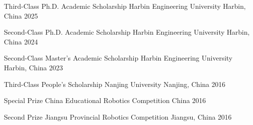 

\begin{cvhonors}

  \cvhonor
    {Third-Class Ph.D. Academic Scholarship}
    {Harbin Engineering University}
    {Harbin, China}
    {2025}

  \cvhonor
    {Second-Class Ph.D. Academic Scholarship}
    {Harbin Engineering University}
    {Harbin, China}
    {2024}

  \cvhonor
    {Second-Class Master's Academic Scholarship}
    {Harbin Engineering University}
    {Harbin, China}
    {2023}

  \cvhonor
    {Third-Class People's Scholarship}
    {Nanjing University}
    {Nanjing, China}
    {2016}

  \cvhonor
    {Special Prize}
    {China Educational Robotics Competition}
    {China}
    {2016}

  \cvhonor
    {Second Prize}
    {Jiangsu Provincial Robotics Competition}
    {Jiangsu, China}
    {2016}

\end{cvhonors}
